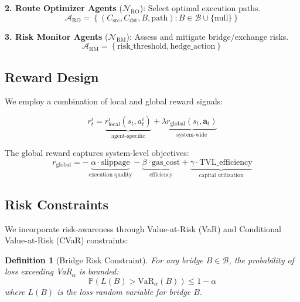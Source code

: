 \documentclass[11pt,a4paper]{article}
\newtheorem{definition}[theorem]{Definition}
\begin{document}
\textbf{2. Route Optimizer Agents} ($\mathcal{N}_{\text{RO}}$): Select optimal execution paths.
\begin{equation}
\mathcal{A}_{\text{RO}} = \left\{ (C_{\text{src}}, C_{\text{dst}}, B, \text{path}) : B \in \mathcal{B} \cup \{\text{null}\} \right\}
\end{equation}

\textbf{3. Risk Monitor Agents} ($\mathcal{N}_{\text{RM}}$): Assess and mitigate bridge/exchange risks.
\begin{equation}
\mathcal{A}_{\text{RM}} = \left\{ \text{risk\_threshold}, \text{hedge\_action} \right\}
\end{equation}

\subsection{Reward Design}

We employ a combination of local and global reward signals:

\begin{equation}\label{eq:reward}
r^i_t = \underbrace{r^i_{\text{local}}(s_t, a^i_t)}_{\text{agent-specific}} + \lambda \underbrace{r_{\text{global}}(s_t, \mathbf{a}_t)}_{\text{system-wide}}
\end{equation}

The global reward captures system-level objectives:
\begin{equation}
r_{\text{global}} = -\underbrace{\alpha \cdot \text{slippage}}_{\text{execution quality}} - \underbrace{\beta \cdot \text{gas\_cost}}_{\text{efficiency}} + \underbrace{\gamma \cdot \text{TVL\_efficiency}}_{\text{capital utilization}}
\end{equation}

\subsection{Risk Constraints}

We incorporate risk-awareness through Value-at-Risk (VaR) and Conditional Value-at-Risk (CVaR) constraints:

\begin{definition}[Bridge Risk Constraint]
For any bridge $B \in \mathcal{B}$, the probability of loss exceeding VaR$_\alpha$ is bounded:
\begin{equation}\label{eq:var}
\mathbb{P}\left( L(B) > \text{VaR}_\alpha(B) \right) \leq 1 - \alpha
\end{equation}
where $L(B)$ is the loss random variable for bridge $B$.
\end{definition}
\end{document}
